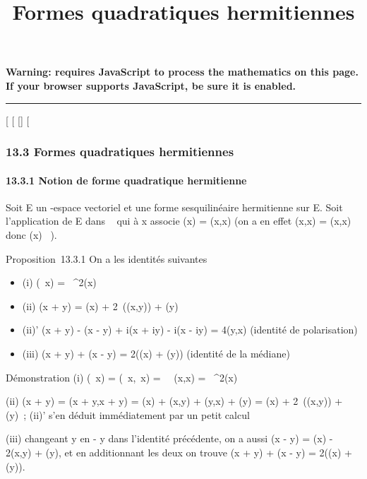 \documentclass[]{article}
\title{Formes quadratiques hermitiennes}
\author{}
\date{}
\begin{document}
\maketitle

\textbf{Warning: 
requires JavaScript to process the mathematics on this page.\\ If your
browser supports JavaScript, be sure it is enabled.}

\begin{center}\rule{3in}{0.4pt}\end{center}

[
[
[]
[

\subsubsection{13.3 Formes quadratiques hermitiennes}

\paragraph{13.3.1 Notion de forme quadratique hermitienne}

Soit E un -espace vectoriel et \phi une forme sesquilinéaire hermitienne
sur E. Soit \Phi l'application de E dans ~ qui à x associe \Phi(x) = \phi(x,x)
(on a en effet \phi(x,x) = \overline\phi(x,x) donc \Phi(x) \in
{}~).

Proposition~13.3.1 On a les identités suivantes

\begin{itemize}
\itemsep1pt\parskip0pt
\item
  (i) \Phi(\lambda~x) = \lambda~^2\Phi(x)
\item
  (ii) \Phi(x + y) = \Phi(x) +
  2\mathrmRe~(\phi(x,y)) + \Phi(y)
\item
  (ii)' \Phi(x + y) - \Phi(x - y) + i\Phi(x + iy) - i\Phi(x - iy) = 4\phi(y,x)
  (identité de polarisation)
\item
  (iii) \Phi(x + y) + \Phi(x - y) = 2(\Phi(x) + \Phi(y)) (identité de la médiane)
\end{itemize}

Démonstration (i) \Phi(\lambda~x) = \phi(\lambda~x,\lambda~x) =
\lambda~\overline\lambda~\phi(x,x) =
\lambda~^2\Phi(x)

(ii) \Phi(x + y) = \phi(x + y,x + y) = \Phi(x) + \phi(x,y) + \phi(y,x) + \Phi(y) = \Phi(x) +
2\mathrmRe~(\phi(x,y)) + \Phi(y)~;
(ii)' s'en déduit immédiatement par un petit calcul

(iii) changeant y en - y dans l'identité précédente, on a aussi \Phi(x - y)
= \Phi(x) - 2\phi(x,y) + \Phi(y), et en additionnant les deux on trouve \Phi(x + y)
+ \Phi(x - y) = 2(\Phi(x) + \Phi(y)).
\end{document}
